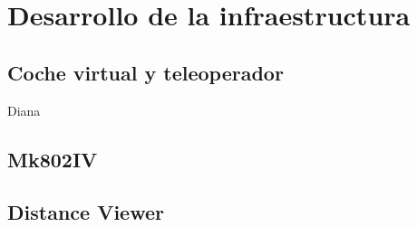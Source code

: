 \chapter{Desarrollo de la infraestructura}\label{CAP:Resul}

\section{Coche virtual y teleoperador}

Diana

\section{Mk802IV}

\section{Distance Viewer}